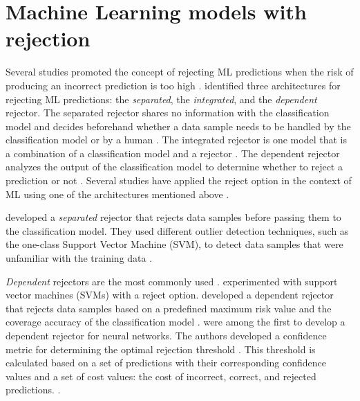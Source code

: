 \section{Machine Learning models with rejection}
Several studies promoted the concept of rejecting ML predictions when the risk of producing an incorrect prediction is too high \citep{sayin2021science, hendrickx2021machine, woo2020future}.
%
\citet{hendrickx2021machine} identified three architectures for rejecting ML predictions: the \emph{separated}, the \emph{integrated}, and the \emph{dependent} rejector.
%
The separated rejector shares no information with the classification model and decides beforehand whether a data sample needs to be handled by the classification model or by a human \citep{hendrickx2021machine}.
%
The integrated rejector is one model that is a combination of a classification model and a rejector \citep{hendrickx2021machine}.
%
The dependent rejector analyzes the output of the classification model to determine whether to reject a prediction or not \citep{hendrickx2021machine}.
%
Several studies have applied the reject option in the context of ML using one of the architectures mentioned above \citep{coenen2020probability, grandvalet2008reject, nadeem2009reject, Geifman2017Selective, geifman2019reject}.
%

%
\citet{coenen2020probability} developed a \emph{separated} rejector that rejects data samples before passing them to the classification model.
%
They used different outlier detection techniques, such as the one-class Support Vector Machine (SVM), to detect data samples that were unfamiliar with
the training data  \citep{coenen2020probability}.
%

%
\emph{Dependent} rejectors are the most commonly used \citep{Geifman2017Selective, de2000reject, grandvalet2008reject}.
%
\citet{grandvalet2008reject} experimented with support vector machines (SVMs) with a reject option.
%
\citet{Geifman2017Selective} developed a dependent rejector that rejects data samples based on a predefined maximum risk value and the coverage accuracy of the classification model \citep{Geifman2017Selective}.
%
\citet{de2000reject} were among the first to develop a dependent rejector for neural networks.
%
The authors developed a confidence metric for determining the optimal rejection threshold \citep{de2000reject}.
%
This threshold is calculated based on a set of predictions with their corresponding confidence values and a set of cost values: the cost of incorrect, correct, and rejected predictions. \citep{de2000reject}.
%

